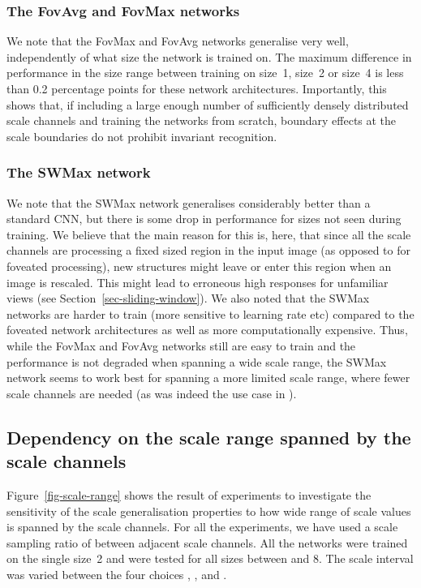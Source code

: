 \documentclass[twocolumn,runningheads]{svjour3}
\begin{document}
\subsubsection{The FovAvg and FovMax networks}

We note that the FovMax and FovAvg networks generalise very well,
independently of what size the network is trained on. The maximum
difference in performance in the size range  between training
on size~1, size~2  or size~4  is less than 0.2 percentage points for
these network architectures.
Importantly, this shows that, if including a large enough number of
sufficiently densely distributed scale channels and training the networks from scratch, boundary
effects at the scale boundaries do not prohibit invariant
recognition.

\subsubsection{The SWMax network}

We note that the SWMax network generalises considerably better than a
standard CNN, but there is some drop in performance for sizes not
seen during training. 
We believe that the main reason for this is, here, that since all the
scale channels are processing a fixed sized region in the input image
(as opposed to for foveated processing), new structures might leave or
enter this region when an image is rescaled. This might lead to
erroneous high responses for unfamiliar views
(see Section~\ref{sec-sliding-window}). 
We also noted that the SWMax networks are harder to train (more
sensitive to learning rate etc) compared to the foveated network
architectures as well as more computationally expensive. 
Thus, while the FovMax and Fov\-Avg networks still are easy to train and
the performance is not degraded when spanning a wide scale range, the
SWMax network seems to work best for spanning a more limited scale
range, where fewer scale channels are needed (as was indeed the use
case in \cite{SerEigZhaMatFerLeC13-arXiv}). 

\subsection{Dependency on the scale range spanned by the scale channels}
\label{sec-dep-scale-range}

Figure~\ref{fig-scale-range} shows the result of experiments to
investigate the sensitivity of the scale generalisation properties to
how wide range of scale values is spanned by the scale channels.
For all the experiments, we have used a scale sampling ratio of
 between adjacent scale channels.
All the networks were trained on the single size~2 and were
tested for all sizes between  and 8.
The scale interval was varied between the four choices
, ,  and
.
\end{document}
